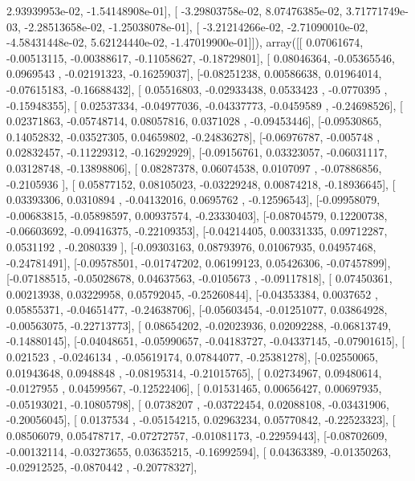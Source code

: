 \documentclass{article}
\begin{document}
          2.93939953e-02,  -1.54148908e-01],
       [ -3.29803758e-02,   8.07476385e-02,   3.71771749e-03,
         -2.28513658e-02,  -1.25038078e-01],
       [ -3.21214266e-02,  -2.71090010e-02,  -4.58431448e-02,
          5.62124440e-02,  -1.47019900e-01]]), array([[ 0.07061674, -0.00513115, -0.00388617, -0.11058627, -0.18729801],
       [ 0.08046364, -0.05365546,  0.0969543 , -0.02191323, -0.16259037],
       [-0.08251238,  0.00586638,  0.01964014, -0.07615183, -0.16688432],
       [ 0.05516803, -0.02933438,  0.0533423 , -0.0770395 , -0.15948355],
       [ 0.02537334, -0.04977036, -0.04337773, -0.0459589 , -0.24698526],
       [ 0.02371863, -0.05748714,  0.08057816,  0.0371028 , -0.09453446],
       [-0.09530865,  0.14052832, -0.03527305,  0.04659802, -0.24836278],
       [-0.06976787, -0.005748  ,  0.02832457, -0.11229312, -0.16292929],
       [-0.09156761,  0.03323057, -0.06031117,  0.03128748, -0.13898806],
       [ 0.08287378,  0.06074538,  0.0107097 , -0.07886856, -0.2105936 ],
       [ 0.05877152,  0.08105023, -0.03229248,  0.00874218, -0.18936645],
       [ 0.03393306,  0.0310894 , -0.04132016,  0.0695762 , -0.12596543],
       [-0.09958079, -0.00683815, -0.05898597,  0.00937574, -0.23330403],
       [-0.08704579,  0.12200738, -0.06603692, -0.09416375, -0.22109353],
       [-0.04214405,  0.00331335,  0.09712287,  0.0531192 , -0.2080339 ],
       [-0.09303163,  0.08793976,  0.01067935,  0.04957468, -0.24781491],
       [-0.09578501, -0.01747202,  0.06199123,  0.05426306, -0.07457899],
       [-0.07188515, -0.05028678,  0.04637563, -0.0105673 , -0.09117818],
       [ 0.07450361,  0.00213938,  0.03229958,  0.05792045, -0.25260844],
       [-0.04353384,  0.0037652 ,  0.05855371, -0.04651477, -0.24638706],
       [-0.05603454, -0.01251077,  0.03864928, -0.00563075, -0.22713773],
       [ 0.08654202, -0.02023936,  0.02092288, -0.06813749, -0.14880145],
       [-0.04048651, -0.05990657, -0.04183727, -0.04337145, -0.07901615],
       [ 0.021523  , -0.0246134 , -0.05619174,  0.07844077, -0.25381278],
       [-0.02550065,  0.01943648,  0.0948848 , -0.08195314, -0.21015765],
       [ 0.02734967,  0.09480614, -0.0127955 ,  0.04599567, -0.12522406],
       [ 0.01531465,  0.00656427,  0.00697935, -0.05193021, -0.10805798],
       [ 0.0738207 , -0.03722454,  0.02088108, -0.03431906, -0.20056045],
       [ 0.0137534 , -0.05154215,  0.02963234,  0.05770842, -0.22523323],
       [ 0.08506079,  0.05478717, -0.07272757, -0.01081173, -0.22959443],
       [-0.08702609, -0.00132114, -0.03273655,  0.03635215, -0.16992594],
       [ 0.04363389, -0.01350263, -0.02912525, -0.0870442 , -0.20778327],
\end{document}
